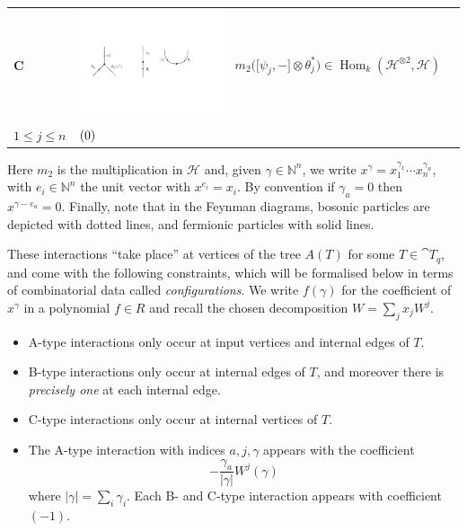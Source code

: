 \documentclass[english,letter paper,12pt,leqno]{article}
\newcommand{\tagarray}{\mbox{}\refstepcounter{equation}$(\theequation)$}
\theoremstyle{example}
\numberwithin{equation}{section}
\def\Hom{\operatorname{Hom}}
\def\be{\begin{equation}}
\def\ee{\end{equation}}
\begin{document}
\begin{center}
\begin{tabular}{ >{\centering}m{1cm} >{\centering}m{4cm} >{\centering}m{8cm} >{\centering}m{1cm}}
\textbf{C}
&
\includegraphics[scale=0.4]{dia4}
&
$m_2 \big( \big[\psi_j,-\big] \otimes \theta_j^* \big) \in \Hom_k( \mathscr{H}^{\otimes 2}, \mathscr{H} )$\\
\vspace{0.5cm}
$1 \le j \le n$
&
\tagarray{\label{interaction_3}}
\end{tabular}
\end{center}
Here $m_2$ is the multiplication in $\mathscr{H}$ and, given $\gamma \in \mathbb{N}^n$, we write $x^\gamma = x_1^{\gamma_1} \cdots x_n^{\gamma_n}$, with $e_i \in \mathbb{N}^n$ the unit vector with $x^{e_i} = x_i$. By convention if $\gamma_a = 0$ then $x^{\gamma - e_a} = 0$. Finally, note that in the Feynman diagrams, bosonic particles are depicted with dotted lines, and fermionic particles with solid lines.

These interactions ``take place'' at vertices of the tree $A(T)$ for some $T \in \cat{T}_q$, and come with the following constraints, which will be formalised below in terms of combinatorial data called \emph{configurations}. We write $f(\gamma)$ for the coefficient of $x^\gamma$ in a polynomial $f \in R$ and recall the chosen decomposition $W = \sum_j x_j W^j$. 

\begin{itemize}
\item A-type interactions only occur at input vertices and internal edges of $T$.
\item B-type interactions only occur at internal edges of $T$, and moreover there is \emph{precisely one} at each internal edge.
\item C-type interactions only occur at internal vertices of $T$.
\item The A-type interaction with indices $a,j, \gamma$ appears with the coefficient
\be\label{eq:coeff_a}
-\frac{\gamma_a}{|\gamma|} W^j( \gamma)
\ee
where $|\gamma| = \sum_i \gamma_i$. Each B- and C-type interaction appears with coefficient $(-1)$.
\end{itemize}
\end{document}
